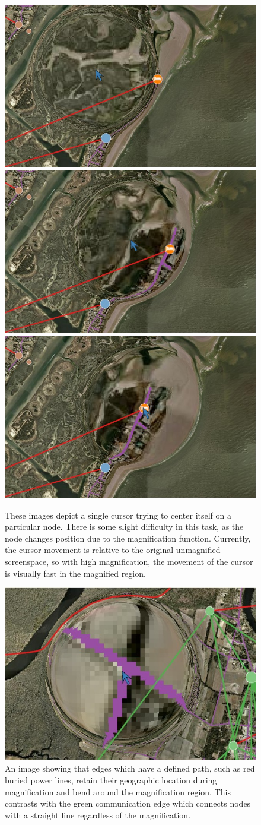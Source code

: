 \begin{figure}[htp]\centering
    \includegraphics[width=0.40\linewidth]{img/12_edge_crop.jpg}
    \includegraphics[width=0.40\linewidth]{img/12_mild_offset_crop.jpg}
    \includegraphics[width=0.40\linewidth]{img/12_center_crop.jpg}
    \caption[Node and Satellite Image Interaction with 3.1x Linear Magnification Centered on Node]{These images depict a single cursor trying to center itself on a particular node. There is some slight difficulty in this task, as the node changes position due to the magnification function. Currently, the cursor movement is relative to the original unmagnified screenspace, so with high magnification, the movement of the cursor is visually fast in the magnified region.}
    \label{fig:centered}
\end{figure}

\begin{figure}[htp]\centering
    \includegraphics[width=0.90\linewidth]{img/p_vs_t_clip.jpg}
    \caption[Edge Differences]{An image showing that edges which have a defined path, such as red buried power lines, retain their geographic location during magnification and bend around the magnification region. This contrasts with the green communication edge which connects nodes with a straight line regardless of the magnification. }
    \label{fig:edge_differences}
\end{figure}

